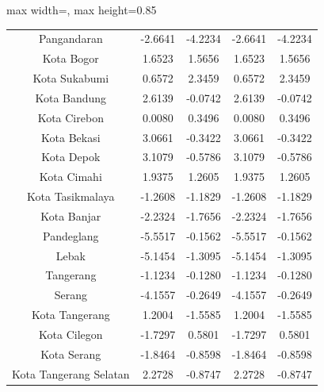 \begin{table}[H]
\begin{adjustbox}{max width=\textwidth, max height=0.85\textheight}
\begin{tabular}{|c|c|c|c|c|}
Pangandaran & -2.6641 & -4.2234 & -2.6641 & -4.2234 \\
Kota Bogor & 1.6523 & 1.5656 & 1.6523 & 1.5656 \\
Kota Sukabumi & 0.6572 & 2.3459 & 0.6572 & 2.3459 \\
Kota Bandung & 2.6139 & -0.0742 & 2.6139 & -0.0742 \\
Kota Cirebon & 0.0080 & 0.3496 & 0.0080 & 0.3496 \\
Kota Bekasi & 3.0661 & -0.3422 & 3.0661 & -0.3422 \\
Kota Depok & 3.1079 & -0.5786 & 3.1079 & -0.5786 \\
Kota Cimahi & 1.9375 & 1.2605 & 1.9375 & 1.2605 \\
Kota Tasikmalaya & -1.2608 & -1.1829 & -1.2608 & -1.1829 \\
Kota Banjar & -2.2324 & -1.7656 & -2.2324 & -1.7656 \\
Pandeglang & -5.5517 & -0.1562 & -5.5517 & -0.1562 \\
Lebak & -5.1454 & -1.3095 & -5.1454 & -1.3095 \\
Tangerang & -1.1234 & -0.1280 & -1.1234 & -0.1280 \\
Serang & -4.1557 & -0.2649 & -4.1557 & -0.2649 \\
Kota Tangerang & 1.2004 & -1.5585 & 1.2004 & -1.5585 \\
Kota Cilegon & -1.7297 & 0.5801 & -1.7297 & 0.5801 \\
Kota Serang & -1.8464 & -0.8598 & -1.8464 & -0.8598 \\
Kota Tangerang Selatan & 2.2728 & -0.8747 & 2.2728 & -0.8747 \\
\hline
\end{tabular}
\end{adjustbox}
\end{table}